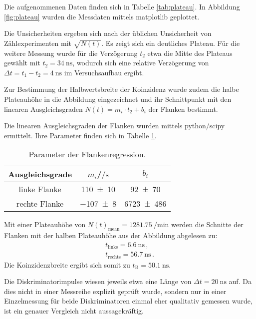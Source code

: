 Die aufgenommenen Daten finden sich in Tabelle \ref{tab:plateau}. In Abbildung \ref{fig:plateau} wurden die Messdaten mittels matplotlib \cite{matplotlib} geplottet.

Die Unsicherheiten ergeben sich nach der üblichen Unsicherheit von Zählexperimenten mit $\sqrt{N(t)}$. Es zeigt sich ein deutliches Plateau.
Für die weitere Messung wurde für die Verzögerung $t_2$ etwa die Mitte des Plateaus gewählt mit $t_2=\SI{34}{\nano\second}$, wodurch sich eine relative Verzögerung von $\Delta t=t_1-t_2=\SI{4}{\nano\second}$ im Versuchsaufbau ergibt.

Zur Bestimmung der Halbwertsbreite der Koinzidenz wurde zudem die halbe Plateauhöhe in die Abbildung eingezeichnet und ihr Schnittpunkt mit den linearen Ausgleichsgraden $N(t)=m_i\cdot t_2+b_i$ der Flanken bestimmt.

Die linearen Ausgleichsgraden der Flanken wurden mittels python/scipy\cite{scipy} ermittelt. Ihre Parameter finden sich in Tabelle \ref{tab:plateau2}.
\begin{table}

	\caption{Parameter der Flankenregression.}
  \label{tab:plateau2}
  \centering

	\begin{tabular}{ccc}
\toprule
		Ausgleichsgrade&$m_i$/$\si{\per\second}$&$b_i$\\
\midrule
		linke Flanke&\num{110(10)}&\num{92(70)}\\
		rechte Flanke&\num{-107(8)}&\num{6723(486)}\\
		\bottomrule
	\end{tabular}
\end{table}
Mit einer Plateauhöhe von $N(t)_{\mathrm{mean}}=\SI{1281.75}{\per\minute}$ werden die Schnitte der Flanken mit der halben Plateauhöhe aus der Abbildung abgelesen zu:
\begin{align*}
t_{\mathrm{links}}=\SI{6.6}{\nano\second}\,\text{,}\\
t_{\mathrm{rechts}}=\SI{56.7}{\nano\second}\,\text{.}
\end{align*}
Die Koinzidenzbreite ergibt sich somit zu $t_{\text{B}}=\SI{50.1}{\nano\second}$.

Die Diskriminatorimpulse wiesen jeweils etwa eine Länge von $\Delta t=\SI{20}{\nano\second}$ auf. Da dies nicht in einer Messreihe explizit geprüft wurde, sondern nur in einer Einzelmessung für beide Diskriminatoren einmal eher qualitativ gemessen wurde, ist ein genauer Vergleich nicht aussagekräftig.

